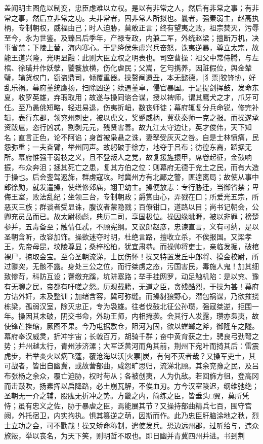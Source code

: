 盖闻明主图危以制变，忠臣虑难以立权。是以有非常之人，然后有非常之事；有非常之事，然后立非常之功。夫非常者，固非常人所拟也。曩者，强秦弱主，赵高执柄，专制朝权，威福由己；时人迫胁，莫敢正言；终有望夷之败，祖宗焚灭，污辱至今，永为世鉴。及臻吕后季年，产禄专政，内兼二军，外统赵梁；擅断万机，决事省禁；下陵上替，海内寒心。于是绛侯朱虚兴兵奋怒，诛夷逆暴，尊立太宗，故能王道兴隆，光明显融：此则大臣立权之明表也。司空曹操：祖父中常侍腾，与左棺、徐璜并作妖孽，饕餮放横，伤化虐民；父嵩，乞匄携养，因赃假位，舆金辇璧，输货权门，窃盗鼎司，倾覆重器。操赘阉遗丑，本无懿德，[犭票]狡锋协，好乱乐祸。幕府董统鹰扬，扫除凶逆；续遇董卓，侵官暴国。于是提剑挥鼓，发命东夏，收罗英雄，弃瑕取用；故遂与操同谘合谋，授以裨师，谓其鹰犬之才，爪牙可任。至乃愚佻短略，轻进易退，伤夷折衄，数丧师徒；幕府辄复分兵命锐，修完补辑，表行东郡，领兖州刺史，被以虎文，奖蹙威柄，冀获秦师一克之报。而操遂承资跋扈，恣行凶忒，割剥元元，残贤害善。故九江太守边让，英才俊伟，天下知名；直言正色，论不阿谄；身首被枭悬之诛，妻孥受灰灭之咎。自是士林愤痛，民怨弥重；一夫奋臂，举州同声。故躬破于徐方，地夺于吕布；彷徨东裔，蹈据无所。幕府惟强干弱枝之义，且不登叛人之党，故复援旌擐甲，席卷起征，金鼓响振，布众奔沮；拯其死亡之患，复其方伯之位：则幕府无德于兖土之民，而有大造于操也。后会銮驾返旆，群虏寇攻。时冀州方有北鄙之警，匪遑离局；故使从事中郎徐勋，就发遣操，使缮修郊庙，翊卫幼主。操便放志：专行胁迁，当御省禁；卑侮王室，败法乱纪；坐领三台，专制朝政；爵赏由心，弄戮在口；所爱光五宗，所恶灭三族；群谈者受显诛，腹议者蒙隐戮；百僚钳口，道路以目；尚书记朝会，公卿充员品而已。故太尉杨彪，典历二司，享国极位。操因缘眦睚，被以非罪；榜楚参并，五毒备至；触情任忒，不顾宪纲。又议郎赵彦，忠谏直言，义有可纳，是以圣朝含听，改容加饰。操欲迷夺时明，杜绝言路，擅收立杀，不俟报国。又梁孝王，先帝母昆，坟陵尊显；桑梓松柏，犹宜肃恭。而操帅将吏士，亲临发掘，破棺裸尸，掠取金宝。至令圣朝流涕，士民伤怀！操又特置发丘中郎将、摸金校尉，所过隳突，无骸不露。身处三公之位，而行桀虏之态，污国害民，毒施人鬼！加其细致惨苛，科防互设；罾缴充蹊，坑阱塞路；举手挂网罗，动足触机陷：是以兖、豫有无聊之民，帝都有吁嗟之怨。历观载籍，无道之臣，贪残酷烈，于操为甚！幕府方诘外奸，未及整训；加绪含容，冀可弥缝。而操豺狼野心，潜包祸谋，乃欲摧挠栋梁，孤弱汉室，除灭忠正，专为袅雄。往者伐鼓北征公孙瓒，强寇桀逆，拒围一年。操因其未破，阴交书命，外助王师，内相掩袭。会其行人发露，瓒亦枭夷，故使锋芒挫缩，厥图不果。今乃屯据敷仓，阻河为固，欲以螳螂之斧，御隆车之隧。幕府奉汉威灵，折冲宇宙；长戟百万，胡骑千群；奋中黄育获之士，骋良弓劲弩之势；并州越太行，青州涉济漯；大军泛黄河而角其前，荆州下宛叶而掎其后：雷震虎步，若举炎火以焫飞蓬，覆沧海以沃[火票]炭，有何不灭者哉？又操军吏士，其可战者，皆出自幽冀，或故营部曲，咸怨旷思归，流涕北顾。其余兖豫之民，及吕布张杨之余众，覆亡迫胁，权时苟从；各被创夷，人为仇敌。若回旆方徂，登高冈而击鼓吹，扬素挥以启降路，必土崩瓦解，不俟血刃。方今汉室陵迟，纲维弛绝；圣朝无一介之辅，股肱无折冲之势。方畿之内，简练之臣，皆垂头□翼，莫所凭恃；虽有忠义之佐，胁于暴虐之臣，焉能展其节？又操持部曲精兵七百，围守宫阙，外托宿卫，内实拘执。惧其篡逆之萌，因斯而作。此乃忠臣肝脑涂地之秋，烈士立功之会，可不勖哉！操又矫命称制，遣使发兵。恐边远州郡，过听给与，违众旅叛，举以丧名，为天下笑，则明哲不取也。即日幽并青冀四州并进。书到荆